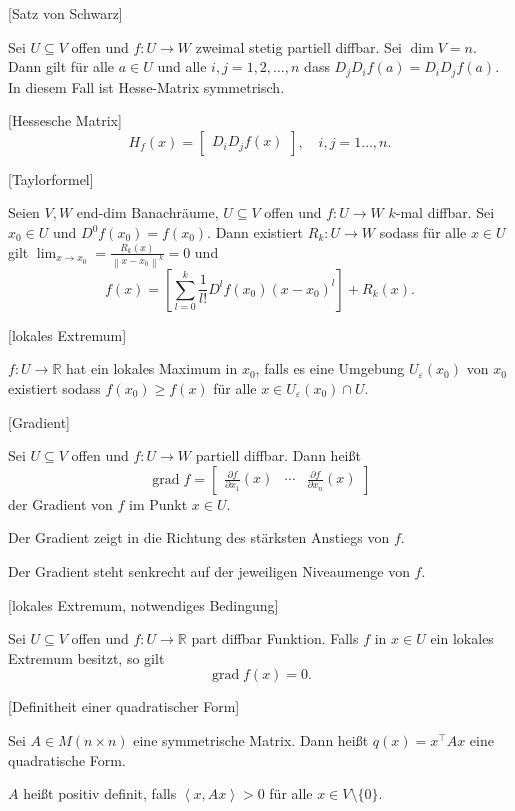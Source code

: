 \documentclass[fleqn,draft,a5paper]{article}
\providecommand{\ang}[1]{\left\langle#1\right\rangle}
\providecommand{\norm}[1]{\left\lVert#1\right\rVert}
\theoremstyle{remark}
\DeclareMathOperator{\grad}{grad}
\begin{document}
[Satz von Schwarz]

Sei \(U \subseteq V\) offen und \(f\colon U \to W\) zweimal stetig partiell diffbar.  Sei
\(\dim V = n\).  Dann gilt für alle \(a \in U\) und alle
\(i,j=1,2,\ldots,n\) dass \(D_{j}D_{i}f(a) = D_{i}D_{j}f(a)\).  In diesem Fall
ist Hesse-Matrix symmetrisch.

[Hessesche Matrix]
\[H_{f}(x) =
  \begin{bmatrix}
    D_{i}D_{j}f(x)
  \end{bmatrix}, \quad
  i , j = 1 \ldots, n.
\]

[Taylorformel]

Seien \(V, W\) end-dim Banachräume, \(U \subseteq V\) offen und
\(f\colon U \to W\) \(k\)-mal diffbar.  Sei \(x_{0} \in U\) und
\(D^{0}f(x_{0})=f(x_{0})\).  Dann existiert \(R_{k}\colon U \to W\) sodass für
alle \(x \in U\) gilt \(\lim_{x\to x_{0}}=\frac{R_{k}(x)}{\norm{x-x_{0}}^{k}}
= 0\) und
\[f(x) =
  \left[\sum_{l=0}^{k}\frac{1}{l!}D^{l}f(x_{0})(x-x_{0})^{l}\right] +
  R_{k}(x).\]

[lokales Extremum]

\(f\colon U \to \mathbb{R}\) hat ein lokales Maximum in \(x_{0}\), falls es eine Umgebung
\(U_{\varepsilon}(x_{0})\) von \(x_{0}\) existiert sodass
\(f(x_{0}) \ge f(x)\) für alle \(x \in U_{\varepsilon}(x_{0}) \cap U \).

[Gradient]

Sei \(U \subseteq V \) offen und \(f\colon U \to W\) partiell diffbar.  Dann heißt
\[\grad  f =
  \begin{bmatrix}
    \frac{\partial f}{\partial x_{1}}(x) & \cdots & \frac{\partial f}{\partial x_{n}}(x)
  \end{bmatrix}
\]
der Gradient von \(f\) im Punkt \(x \in U\).

Der Gradient zeigt in die Richtung des stärksten Anstiegs von \(f\).

Der Gradient steht senkrecht auf der jeweiligen Niveaumenge von \(f\).

[lokales Extremum, notwendiges Bedingung]

Sei \(U \subseteq V\) offen und \(f\colon U \to \mathbb{R}\) part diffbar Funktion.  Falls \(f\) in
\(x \in U\) ein lokales Extremum besitzt, so gilt
\[\grad  f(x) = 0.\]

[Definitheit einer quadratischer Form]

Sei \(A \in M(n \times n)\) eine symmetrische Matrix.  Dann heißt \(q(x) =
x^{\top}Ax\) eine quadratische Form.

\(A\) heißt positiv definit, falls \(\ang{x, Ax}>0\) für alle \(x \in V \setminus
\{0\}\).
\end{document}
